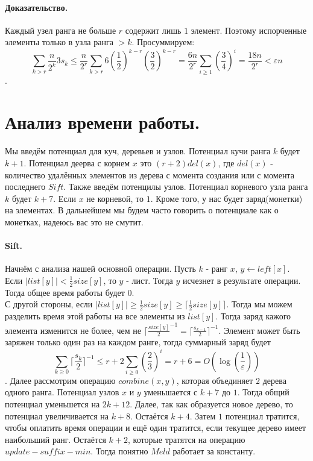 \documentclass{article}
\begin{document}
		\paragraph{Доказательство.}
		Каждый узел ранга не больше $r$ содержит лишь $1$ элемент. Поэтому испорченные элементы только в узла ранга $>k$. Просуммируем:
		$$\sum_{k>r}\frac{n}{2^k}3s_k \leq \frac{n}{2^r} \sum_{k > r} 6(\frac{1}{2})^{k-r}(\frac{3}{2})^{k-r} = \frac{6n}{2^r}\sum_{i \geq 1}(\frac{3}{4})^i = \frac{18n}{2^r} < \varepsilon n$$.
	\section{Анализ времени работы.}
		\paragraph{}
		Мы введём потенциал для куч, деревьев и узлов. Потенциал кучи ранга $k$ будет $k+1$. Потенциал деерва с корнем $x$ это $(r+2)del(x)$, где $del(x)$ - количество удалённых элементов из дерева с момента создания или с момента последнего $Sift$. Также  введём потенцилы узлов. Потенциал корневого узла ранга $k$ будет $k+7$. Если $x$ не корневой, то $1$. Кроме того, у нас будет заряд(монетки) на элементах. В дальнейшем мы будем часто говорить о потенциале как о монетках, надеюсь вас это не смутит.
		\paragraph{Sift.} 
		Начнём с анализа нашей основной операции. Пусть $k$ - ранг $x$, $y \leftarrow left[x]$. Если $|list[y]| < \frac{1}{2}size[y]$, то $y$ - лист. Тогда $y$ исчезнет в результате операции. Тогда общее время работы будет $0$. \\
		С другой стороны,  если $|list[y]| \geq \frac{1}{2}size[y] \geq \lceil \frac{1}{2}size[y] \rceil$. Тогда мы можем разделить время этой работы на все элементы из $list[y]$. Тогда заряд кажого элемента изменится не более, чем не $\lceil \frac{size[y]}{2}^{-1} = \lceil \frac{s_{k-1}}{2} \rceil ^{-1}$. Элемент может быть заряжен только один раз на каждом ранге, тогда суммарный заряд будет 
		$$\sum_{k\geq 0}\lceil \frac{s_k}{2}\rceil^{-1} \leq r + 2\sum_{i \geq 0}(\frac{2}{3})^i = r + 6 = O(\log(\frac{1}{\varepsilon}))$$.
		Далее рассмотрим операцию $combine(x,y)$, которая объединяет $2$ дерева одного ранга. Потенциал узлов $x$ и $y$ уменьшается с $k+7$ до $1$. Тогда общий потенциал уменьшется на $2k+12$. Далее, так как образуется новое дерево, то потенциал увеличивается на $k+8$. Остаётся $k+4$. Затем $1$ потенциал тратится, чтобы оплатить время операции и ещё один тратится, если текущее дерево имеет наибольший ранг. Остаётся $k+2$, которые тратятся на операцию  $update-suffix-min$. Тогда понятно $Meld$ работает за константу.
\end{document}
